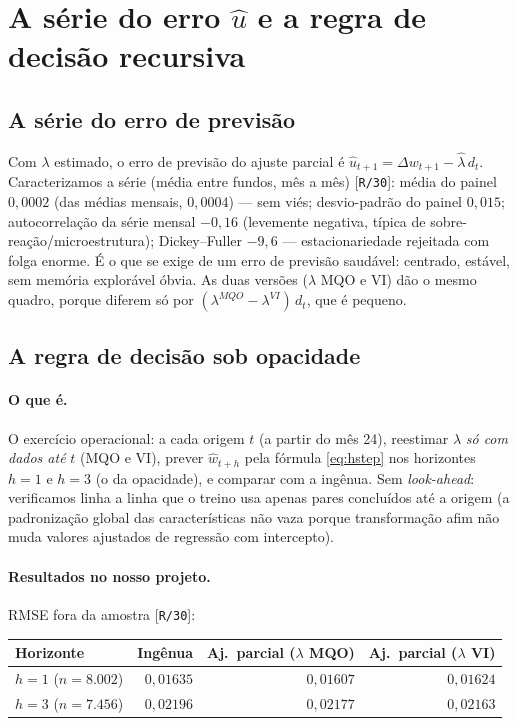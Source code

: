 \documentclass[11pt,a4paper]{article}
\newcommand{\oquee}[0]{\paragraph{O que é.}}
\newcommand{\resultados}[0]{\paragraph{Resultados no nosso projeto.}}
\newcommand{\scriptref}[1]{{\footnotesize\color{cinza}[\texttt{#1}]}}
\begin{document}
\section{A série do erro $\widehat u$ e a regra de decisão recursiva}
\label{sec:decisao}

\subsection{A série do erro de previsão}

Com $\lambda$ estimado, o erro de previsão do ajuste parcial é
$\widehat u_{t+1} = \Delta w_{t+1} - \widehat\lambda\,d_t$. Caracterizamos a série (média entre
fundos, mês a mês) \scriptref{R/30}: média do painel $0{,}0002$ (das médias mensais, $0{,}0004$)
--- sem viés; desvio-padrão do painel $0{,}015$; autocorrelação da série mensal $-0{,}16$
(levemente negativa, típica de sobre-reação/microestrutura); Dickey--Fuller $-9{,}6$ ---
estacionariedade rejeitada com folga enorme. É o que se exige de um erro de previsão saudável:
centrado, estável, sem memória explorável óbvia. As duas versões ($\lambda$ MQO e VI) dão o mesmo
quadro, porque diferem só por $(\lambda^{MQO}-\lambda^{VI})\,d_t$, que é pequeno.

\subsection{A regra de decisão sob opacidade}

\oquee O exercício operacional: a cada origem $t$ (a partir do mês 24), reestimar $\lambda$
\emph{só com dados até} $t$ (MQO e VI), prever $\widehat w_{t+h}$ pela fórmula \eqref{eq:hstep}
nos horizontes $h=1$ e $h=3$ (o da opacidade), e comparar com a ingênua. Sem \emph{look-ahead}:
verificamos linha a linha que o treino usa apenas pares concluídos até a origem (a padronização
global das características não vaza porque transformação afim não muda valores ajustados de
regressão com intercepto).

\resultados RMSE fora da amostra \scriptref{R/30}:

\begin{center}\small
\begin{tabular}{@{}lrrr@{}}
\toprule
Horizonte & Ingênua & Aj.\ parcial ($\lambda$ MQO) & Aj.\ parcial ($\lambda$ VI) \\
\midrule
$h=1$ ($n=8.002$) & $0{,}01635$ & $0{,}01607$ & $0{,}01624$ \\
$h=3$ ($n=7.456$) & $0{,}02196$ & $0{,}02177$ & $0{,}02163$ \\
\bottomrule
\end{tabular}
\end{center}
\end{document}
